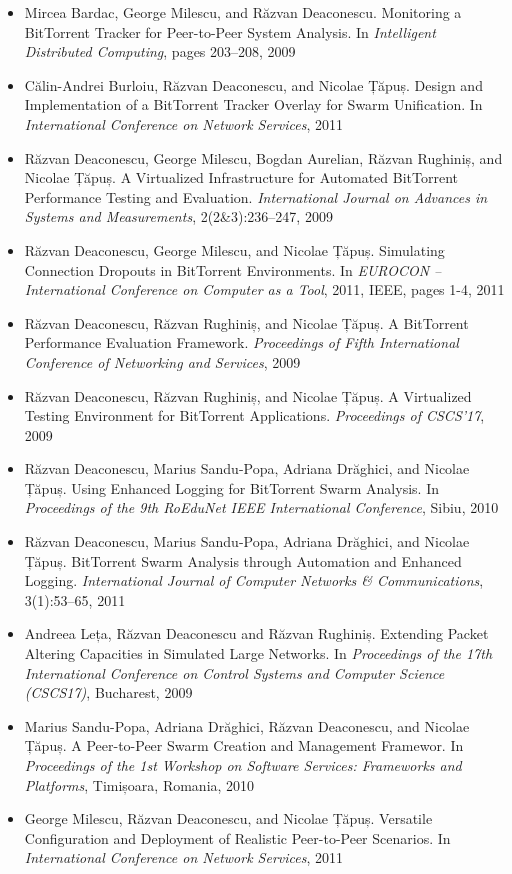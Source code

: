 \begin{itemize}
  \item Mircea Bardac, George Milescu, and Răzvan Deaconescu. Monitoring a
  BitTorrent Tracker for Peer-to-Peer System Analysis. In \textit{Intelligent
  Distributed Computing}, pages 203--208, 2009
  \item Călin-Andrei Burloiu, Răzvan Deaconescu, and Nicolae Țăpuș. Design and
  Implementation of a BitTorrent Tracker Overlay for Swarm Unification. In
  \textit{International Conference on Network Services}, 2011
  \item Răzvan Deaconescu, George Milescu, Bogdan Aurelian, Răzvan Rughiniș,
  and Nicolae Țăpuș. A Virtualized Infrastructure for Automated BitTorrent
  Performance Testing and Evaluation. \textit{International Journal on
  Advances in Systems and Measurements}, 2(2\&3):236--247, 2009
  \item Răzvan Deaconescu, George Milescu, and Nicolae Țăpuș. Simulating
  Connection Dropouts in BitTorrent Environments. In \textit{EUROCON --
  International Conference on Computer as a Tool}, 2011, IEEE, pages 1-4, 2011
  \item Răzvan Deaconescu, Răzvan Rughiniș, and Nicolae Țăpuș. A BitTorrent
  Performance Evaluation Framework. \textit{Proceedings of Fifth International
  Conference of Networking and Services}, 2009
  \item Răzvan Deaconescu, Răzvan Rughiniș, and Nicolae Țăpuș. A Virtualized
  Testing Environment for BitTorrent Applications. \textit{Proceedings of
  CSCS'17}, 2009
  \item Răzvan Deaconescu, Marius Sandu-Popa, Adriana Drăghici, and Nicolae
  Țăpuș. Using Enhanced Logging for BitTorrent Swarm Analysis. In
  \textit{Proceedings of the 9th RoEduNet IEEE International Conference},
  Sibiu, 2010
  \item Răzvan Deaconescu, Marius Sandu-Popa, Adriana Drăghici, and Nicolae
  Țăpuș. BitTorrent Swarm Analysis through Automation and Enhanced Logging.
  \textit{International Journal of Computer Networks \& Communications},
  3(1):53--65, 2011
  \item Andreea Leța, Răzvan Deaconescu and Răzvan Rughiniș. Extending Packet
  Altering Capacities in Simulated Large Networks. In \textit{Proceedings of
  the 17th International Conference on Control Systems and Computer Science
  (CSCS17)}, Bucharest, 2009
  \item Marius Sandu-Popa, Adriana Drăghici, Răzvan Deaconescu, and Nicolae
  Țăpuș. A Peer-to-Peer Swarm Creation and Management Framewor. In
  \textit{Proceedings of the 1st Workshop on Software Services: Frameworks and
  Platforms}, Timișoara, Romania, 2010
  \item George Milescu, Răzvan Deaconescu, and Nicolae Țăpuș. Versatile
  Configuration and Deployment of Realistic Peer-to-Peer Scenarios. In
  \textit{International Conference on Network Services}, 2011
\end{itemize}
